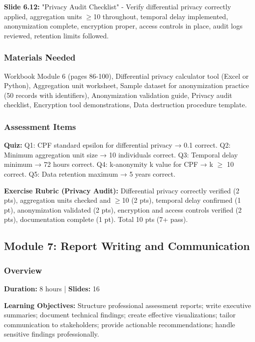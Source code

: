 \documentclass[11pt,a4paper]{article}
\begin{document}
\textbf{Slide 6.12:} "Privacy Audit Checklist" - Verify differential privacy correctly applied, aggregation units $\ge$10 throughout, temporal delay implemented, anonymization complete, encryption proper, access controls in place, audit logs reviewed, retention limits followed.

\subsubsection{Materials Needed}

Workbook Module 6 (pages 86-100), Differential privacy calculator tool (Excel or Python), Aggregation unit worksheet, Sample dataset for anonymization practice (50 records with identifiers), Anonymization validation guide, Privacy audit checklist, Encryption tool demonstrations, Data destruction procedure template.

\subsubsection{Assessment Items}

\textbf{Quiz:} Q1: CPF standard epsilon for differential privacy → 0.1 correct. Q2: Minimum aggregation unit size → 10 individuals correct. Q3: Temporal delay minimum → 72 hours correct. Q4: k-anonymity k value for CPF → k $\ge$ 10 correct. Q5: Data retention maximum → 5 years correct.

\textbf{Exercise Rubric (Privacy Audit):} Differential privacy correctly verified (2 pts), aggregation units checked and $\ge$10 (2 pts), temporal delay confirmed (1 pt), anonymization validated (2 pts), encryption and access controls verified (2 pts), documentation complete (1 pt). Total 10 pts (7+ pass).

\subsection{Module 7: Report Writing and Communication}

\subsubsection{Overview}
\textbf{Duration:} 8 hours | \textbf{Slides:} 16

\textbf{Learning Objectives:} Structure professional assessment reports; write executive summaries; document technical findings; create effective visualizations; tailor communication to stakeholders; provide actionable recommendations; handle sensitive findings professionally.
\end{document}

